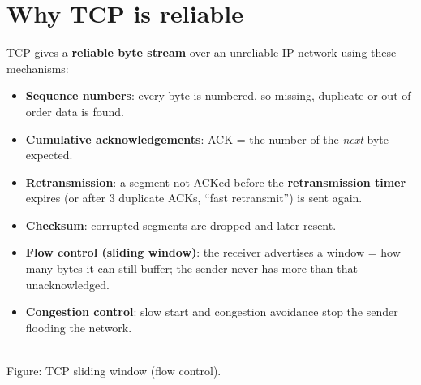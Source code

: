 \documentclass[10pt]{article}
\begin{document}
\section{Why TCP is reliable}

TCP gives a \textbf{reliable byte stream} over an unreliable IP network using these mechanisms:
\begin{itemize}
\item \textbf{Sequence numbers}: every byte is numbered, so missing, duplicate or out-of-order data is found.
\item \textbf{Cumulative acknowledgements}: ACK = the number of the \emph{next} byte expected.
\item \textbf{Retransmission}: a segment not ACKed before the \textbf{retransmission timer} expires (or after 3 duplicate ACKs, ``fast retransmit'') is sent again.
\item \textbf{Checksum}: corrupted segments are dropped and later resent.
\item \textbf{Flow control (sliding window)}: the receiver advertises a window = how many bytes it can still buffer; the sender never has more than that unacknowledged.
\item \textbf{Congestion control}: slow start and congestion avoidance stop the sender flooding the network.
\end{itemize}

\begin{center}
\\
{\scriptsize\color{midgrey}Figure: TCP sliding window (flow control).}
\end{center}
\end{document}
